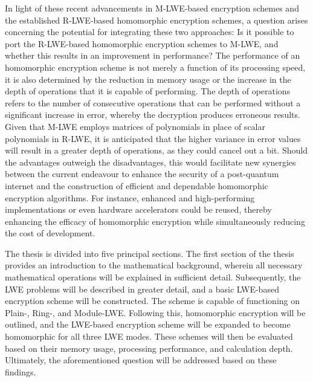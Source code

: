 
In light of these recent advancements in M-LWE-based encryption schemes and the established R-LWE-based homomorphic encryption schemes, a question arises concerning the potential for integrating these two approaches: Is it possible to port the R-LWE-based homomorphic encryption schemes to M-LWE, and whether this results in an improvement in performance? The performance of an homomorphic encryption scheme is not merely a function of its processing speed, it is also determined by the reduction in memory usage or the increase in the depth of operations that it is capable of performing. The depth of operations refers to the number of consecutive operations that can be performed without a significant increase in error, whereby the decryption produces erroneous results. Given that M-LWE employs matrices of polynomials in place of scalar polynomials in R-LWE, it is anticipated that the higher variance in error values will result in a greater depth of operations, as they could cancel out a bit. Should the advantages outweigh the disadvantages, this would facilitate new synergies between the current endeavour to enhance the security of a post-quantum internet and the construction of efficient and dependable homomorphic encryption algorithms. For instance, enhanced and high-performing implementations or even hardware accelerators could be reused, thereby enhancing the efficacy of homomorphic encryption while simultaneously reducing the cost of development.

The thesis is divided into five principal sections. The first section of the thesis provides an introduction to the mathematical background, wherein all necessary mathematical operations will be explained in sufficient detail. Subsequently, the LWE problems will be described in greater detail, and a basic LWE-based encryption scheme will be constructed. The scheme is capable of functioning on Plain-, Ring-, and Module-LWE. Following this, homomorphic encryption will be outlined, and the LWE-based encryption scheme will be expanded to become homomorphic for all three LWE modes. These schemes will then be evaluated based on their memory usage, processing performance, and calculation depth. Ultimately, the aforementioned question will be addressed based on these findings.
